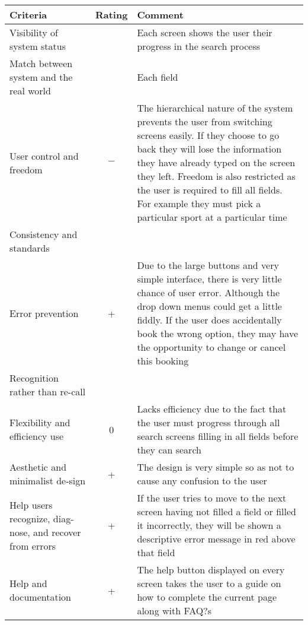 \begin{table}
\begin{center}
	\renewcommand{\arraystretch}{2}
	\begin{longtable}{p{} c p{}}
		\toprule
		\textbf{Criteria} & \textbf{Rating} & \textbf{Comment}\\
		\midrule
		Visibility of system status &  & Each screen shows the user their
		progress in the search process \\

		Match between system and the real world &  & Each field  \\

		User control and freedom & $-$ & The hierarchical nature of the system
		prevents the user from switching screens easily. If they choose to go
		back they will lose the information they have already typed on the
		screen they left. Freedom is also restricted as the user is required to
		fill all fields. For example they must pick a particular sport at a
		particular time \\

		Consistency and standards &  &  \\

		Error prevention & + & Due to the large buttons and very simple
		interface, there is very little chance of user error. Although the drop
		down menus could get a little fiddly. If the user does accidentally
		book the wrong option, they may have the opportunity to change or
		cancel this booking \\

		Recognition rather than re-call &  &  \\

		Flexibility and efficiency use & 0 & Lacks efficiency due to the fact
		that the user must progress through all search screens filling in all
		fields before they can search \\

		Aesthetic and minimalist de-sign & + & The design is very simple so as
		not to cause any confusion to the user \\

		Help users recognize, diag-nose, and recover from errors & + & If the
		user tries to move to the next screen having not filled a field or
		filled it incorrectly,  they will be shown a descriptive error message
		in red above that field \\

		Help and documentation & + & The help button displayed on every screen
		takes the user to a guide on how to complete the current page along
		with FAQ?s \\
		\end{longtable}
	\end{center}
\end{table}


